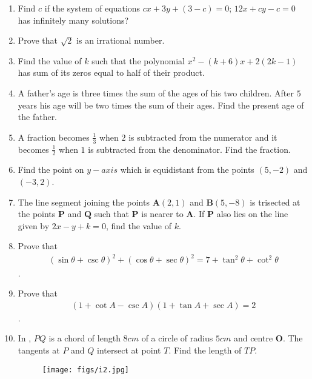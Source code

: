 \documentclass[12pt,-letter paper]{article}
\let\vec\mathbf{}
\let\vec\mathbf{}
\let\vec\mathbf{}
\providecommand{\brak}[1]{\ensuremath{\left(#1\right)}}\graphicspath{{/storage/self/primary/Download/latexnew/fig}}
\begin{document}
\begin{enumerate}
\item Find $c$ if the system of equations $cx+3y+(3-c)=0$; $12x+cy-c=0$ has infinitely many solutions?
\item Prove that $\sqrt{2}$ is an irrational number.
\item Find the value of $k$ such that the polynomial $ x^2-\brak{k+6}x+2\brak{2k-1}$ has sum of its zeros equal to half of their product.
\item A father's age is three times the sum of the ages of his two children. After $5$ years his age will be two times the sum of their ages. Find the present age of the father.
\item A fraction becomes $\frac{1}{3}$ when $2$ is subtracted from the numerator and it becomes $\frac{1}{2}$ when $1$ is subtracted from the denominator. Find the fraction.
\item Find the point on $y-axis$ which is equidistant from the points $\brak{5, -2}$ and $\brak{-3, 2}$.
\item The line segment joining the points $\vec{A}\brak{2, 1}$ and $\vec{B}\brak{5, -8}$ is trisected at the points $\vec{P}$ and $\vec{Q}$ such that $\vec{P}$ is nearer to $\vec{A}$. If $\vec{P}$ also lies on the line given by $2x-y+k=0$, find the value of $k$.
\item Prove that \begin{align*} \brak{\sin\theta + \csc\theta}^2 + \brak{\cos\theta + \sec\theta}^2 = 7 + \tan^2\theta + \cot^2\theta\end{align*}.
\item Prove that \begin{align*}\brak{1+\cot A - \csc A} \brak{1 + \tan A +\sec A} = 2 \end{align*}.
\item In , $PQ$ is a chord of length $8 cm$ of a circle of radius $5 cm$ and centre $\vec{O}$. The tangents at $P$ and $Q$ intersect at point $T$. Find the length of $TP$.
\begin{figure}[H]                                             \centering
         \texttt{[image: figs/i2.jpg]}
			\caption{}
			\label{fig:figure2}


\end{figure}
\end{enumerate}
\end{document}
